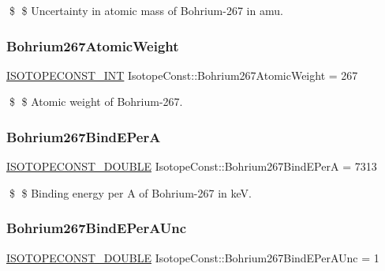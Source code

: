 \$ \$ Uncertainty in atomic mass of Bohrium-\/267 in amu. \mbox{\label{group___isotope_const-_bohrium-_bh267_ga2bc671cdea2973c1cf6cc78c7b071e50}} 
\subsubsection{\texorpdfstring{Bohrium267\+Atomic\+Weight}{Bohrium267AtomicWeight}}
{\footnotesize\ttfamily \mbox{\hyperlink{group___isotope_const-_macros_ga5f18360b3e99483a35c32d789e62621c}{I\+S\+O\+T\+O\+P\+E\+C\+O\+N\+S\+T\+\_\+\+I\+NT}} Isotope\+Const\+::\+Bohrium267\+Atomic\+Weight = 267}

\$ \$ Atomic weight of Bohrium-\/267. \mbox{\label{group___isotope_const-_bohrium-_bh267_gac6c837cfae65eb73afaed5cd1425ee74}} 
\subsubsection{\texorpdfstring{Bohrium267\+Bind\+E\+PerA}{Bohrium267BindEPerA}}
{\footnotesize\ttfamily \mbox{\hyperlink{group___isotope_const-_macros_ga8f45a7272ce02c0b4c65c44636ed719a}{I\+S\+O\+T\+O\+P\+E\+C\+O\+N\+S\+T\+\_\+\+D\+O\+U\+B\+LE}} Isotope\+Const\+::\+Bohrium267\+Bind\+E\+PerA = 7313}

\$ \$ Binding energy per A of Bohrium-\/267 in keV. \mbox{\label{group___isotope_const-_bohrium-_bh267_gab1883700ea87ef28d64988dce6d41d35}} 
\subsubsection{\texorpdfstring{Bohrium267\+Bind\+E\+Per\+A\+Unc}{Bohrium267BindEPerAUnc}}
{\footnotesize\ttfamily \mbox{\hyperlink{group___isotope_const-_macros_ga8f45a7272ce02c0b4c65c44636ed719a}{I\+S\+O\+T\+O\+P\+E\+C\+O\+N\+S\+T\+\_\+\+D\+O\+U\+B\+LE}} Isotope\+Const\+::\+Bohrium267\+Bind\+E\+Per\+A\+Unc = 1}

